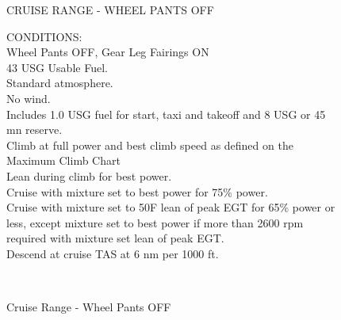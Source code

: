 \begin{figure}[t]
\begin{center}
\begin{perfhdr}CRUISE RANGE - WHEEL PANTS OFF\\
\end{perfhdr}

\begin{minipage}{5in}
  \begin{flushleft}
    CONDITIONS:\\
    Wheel Pants OFF, Gear Leg Fairings ON\\
    43 USG Usable Fuel.\\
    Standard atmosphere.\\
    No wind.\\
    Includes 1.0 USG fuel for start, taxi and takeoff and 8 USG or 45 mn reserve.\\
    Climb at full power and best climb speed as defined on the Maximum Climb Chart\\
    Lean during climb for best power.\\
    Cruise with mixture set to best power for 75\% power.  \\
    Cruise with mixture set to 50\textdegree F lean of peak EGT for 65\% power or less, except mixture set to best power if more than 2600 rpm required with mixture set lean of peak EGT.\\
    Descend at cruise TAS at 6 nm per 1000 ft.\\
    \end{flushleft}
\end{minipage}\\
\vspace{5ex}
\end{center}  %
\caption{Cruise Range - Wheel Pants OFF}
\label{Cruise-range-WP-OFF}
\end{figure}
\clearpage


